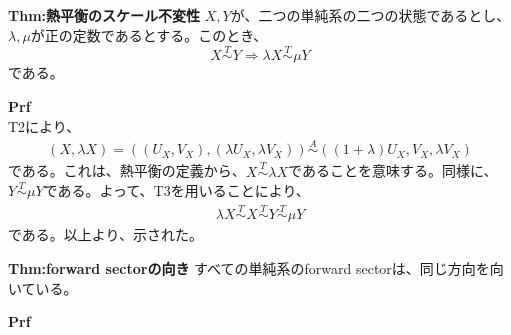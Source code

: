 \documentclass[a4paper,11pt]{jsarticle}
\numberwithin{equation}{section}
\begin{document}
\begin{itembox}[l]{\textbf{Thm:熱平衡のスケール不変性}}
    $X,Y$が、二つの単純系の二つの状態であるとし、$\lambda,\mu$が正の定数であるとする。このとき、
    \begin{equation}
        X \overset{T}{\sim} Y \Rightarrow \lambda X \overset{T}{\sim} \mu Y
    \end{equation}
    である。
\end{itembox}
\textbf{Prf}\\
T2により、
\begin{align}
    (X,\lambda X) =((U_X,V_X),(\lambda U_X,\lambda V_X)) \overset{A}{\sim} ((1+\lambda)U_X,V_X,\lambda V_X) 
\end{align}
である。これは、熱平衡の定義から、$X \overset{T}{\sim} \lambda X$であることを意味する。同様に、$Y \overset{T}{\sim} \mu Y$である。よって、T3を用いることにより、
\begin{align}
    \lambda X \overset{T}{\sim} X \overset{T}{\sim} Y \overset{T}{\sim} \mu Y
\end{align}
である。以上より、示された。\hfill\qedsymbol\\

\begin{itembox}[l]{\textbf{Thm:forward sectorの向き}}
すべての単純系のforward sectorは、同じ方向を向いている。
\end{itembox}
\textbf{Prf}\\
\end{document}
